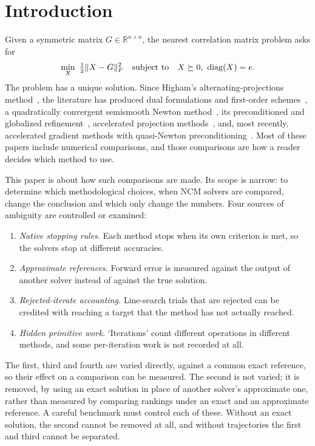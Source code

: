 \section{Introduction}\label{sec:intro}

Given a symmetric matrix $G\in\mathbb{R}^{n\times n}$, the nearest correlation
matrix problem asks for
\begin{equation}\label{eq:ncm}
  \min_{X}\ \tfrac12\fro{X-G}^2 \quad\text{subject to}\quad X\succeq 0,\ \diag(X)=e .
\end{equation}
The problem has a unique solution. Since Higham's alternating-projections
method~\cite{higham2002nearest}, the literature has produced dual formulations and
first-order schemes~\cite{malick2004dual,boyd2005least}, a quadratically convergent
semismooth Newton method~\cite{qisun2006quadratically}, its preconditioned and globalized
refinement~\cite{borsdorf2010preconditioned}, accelerated projection
methods~\cite{higham2016anderson}, and, most recently, accelerated gradient
methods with quasi-Newton preconditioning~\cite{huynh2025accelerated}. Most of these
papers include numerical comparisons, and those comparisons are how a reader
decides which method to use.

This paper is about how such comparisons are made. Its scope is narrow: to
determine which methodological choices, when NCM solvers are compared, change
the conclusion and which only change the numbers. Four sources of ambiguity
are controlled or examined:
\begin{enumerate}
  \item \emph{Native stopping rules.} Each method stops when its own criterion
    is met, so the solvers stop at different accuracies.
  \item \emph{Approximate references.} Forward error is measured against the
    output of another solver instead of against the true solution.
  \item \emph{Rejected-iterate accounting.} Line-search trials that are
    rejected can be credited with reaching a target that the method has not
    actually reached.
  \item \emph{Hidden primitive work.} `Iterations' count different
    operations in different methods, and some per-iteration work is not
    recorded at all.
\end{enumerate}
The first, third and fourth are varied directly, against a common exact
reference, so their effect on a comparison can be measured. The second is not
varied; it is removed, by using an exact solution in place of another
solver's approximate one, rather than measured by comparing rankings under
an exact and an approximate reference. A careful benchmark must control each
of these. Without an exact solution, the second cannot be removed at all,
and without trajectories the first and third cannot be separated.

